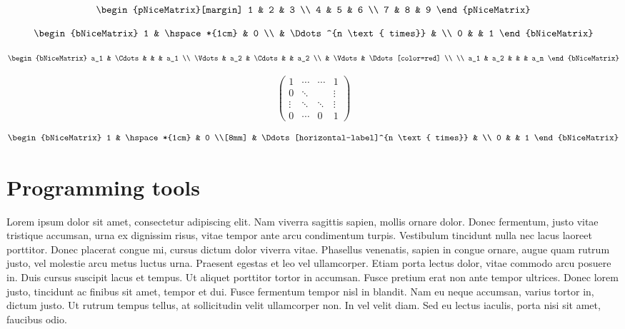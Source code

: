 	\[
	\begin{pNiceMatrix}[margin]
		1 & 2 & 3 \\
		4 & 5 & 6 \\
		7 & 8 & 9
	\end{pNiceMatrix}
	\]
	
\[
\begin{bNiceMatrix}
	1 & \hspace*{1cm} & 0 \\
	& \Ddots^{n \text{ times}} & \\
	0 & & 1
\end{bNiceMatrix}
\]

\[
\begin{bNiceMatrix}
	a_1 & \Cdots & & & a_1 \\
	\Vdots & a_2 & \Cdots & & a_2 \\
	& \Vdots & \Ddots[color=red] \\
	\\
	a_1 & a_2 & & & a_n
\end{bNiceMatrix}
\]

\[
\begin{pmatrix}
	1 & \cdots & \cdots & 1 \\
	0 & \ddots & & \vdots \\
	\vdots & \ddots & \ddots & \vdots \\
	0 & \cdots & 0 & 1
\end{pmatrix}
\]

\[
\begin{bNiceMatrix}
	1 & \hspace*{1cm} & 0 \\[8mm]
	& \Ddots[horizontal-label]^{n \text{ times}} & \\
	0 & & 1
\end{bNiceMatrix}
\]


\chapter{Programming tools}

Lorem ipsum dolor sit amet, consectetur adipiscing elit. Nam viverra sagittis sapien, mollis ornare dolor. Donec fermentum, justo vitae tristique accumsan, urna ex dignissim risus, vitae tempor ante arcu condimentum turpis. Vestibulum tincidunt nulla nec lacus laoreet porttitor. Donec placerat congue mi, cursus dictum dolor viverra vitae. Phasellus venenatis, sapien in congue ornare, augue quam rutrum justo, vel molestie arcu metus luctus urna. Praesent egestas et leo vel ullamcorper. Etiam porta lectus dolor, vitae commodo arcu posuere in. Duis cursus suscipit lacus et tempus. Ut aliquet porttitor tortor in accumsan. Fusce pretium erat non ante tempor ultrices. Donec lorem justo, tincidunt ac finibus sit amet, tempor et dui. Fusce fermentum tempor nisl in blandit. Nam eu neque accumsan, varius tortor in, dictum justo. Ut rutrum tempus tellus, at sollicitudin velit ullamcorper non. In vel velit diam. Sed eu lectus iaculis, porta nisi sit amet, faucibus odio.

